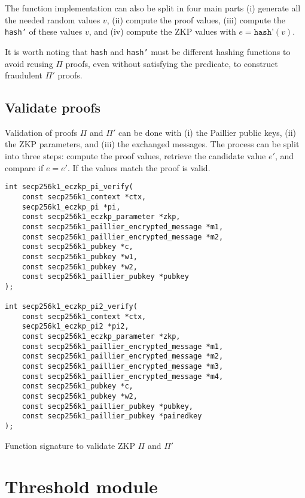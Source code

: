 The function implementation can also be split in four main parts (i) generate
all the needed random values $v$, (ii) compute the proof values, (iii) compute
the \texttt{hash'} of these values $v$, and (iv) compute the ZKP values with $e =
\texttt{hash'}(v)$.

It is worth noting that \texttt{hash} and \texttt{hash'} must be different
hashing functions to avoid reusing $\Pi$ proofs, even without satisfying the
predicate, to construct fraudulent $\Pi'$ proofs.

\subsection{Validate proofs}

Validation of proofs $\Pi$ and $\Pi'$ can be done with (i) the Paillier public
keys, (ii) the ZKP parameters, and (iii) the exchanged messages. The process can
be split into three steps: compute the proof values, retrieve the candidate
value $e'$, and compare if $e = e'$. If the values match the proof is valid.

\begin{longlisting}
  \begin{verbatim}
int secp256k1_eczkp_pi_verify(
    const secp256k1_context *ctx,
    secp256k1_eczkp_pi *pi,
    const secp256k1_eczkp_parameter *zkp,
    const secp256k1_paillier_encrypted_message *m1,
    const secp256k1_paillier_encrypted_message *m2,
    const secp256k1_pubkey *c,
    const secp256k1_pubkey *w1,
    const secp256k1_pubkey *w2,
    const secp256k1_paillier_pubkey *pubkey
);

int secp256k1_eczkp_pi2_verify(
    const secp256k1_context *ctx,
    secp256k1_eczkp_pi2 *pi2,
    const secp256k1_eczkp_parameter *zkp,
    const secp256k1_paillier_encrypted_message *m1,
    const secp256k1_paillier_encrypted_message *m2,
    const secp256k1_paillier_encrypted_message *m3,
    const secp256k1_paillier_encrypted_message *m4,
    const secp256k1_pubkey *c,
    const secp256k1_pubkey *w2,
    const secp256k1_paillier_pubkey *pubkey,
    const secp256k1_paillier_pubkey *pairedkey
);
  \end{verbatim}
	\caption{Function signature to validate ZKP $\Pi$ and $\Pi'$}
	\label{lst:funcSigValidatePiPi2}
\end{longlisting}


\section{Threshold module}

